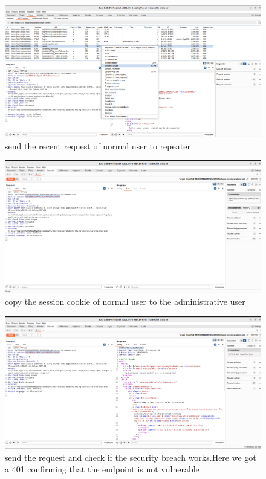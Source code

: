 \documentclass[
	a4paper, %
	12pt, %
]{CSSullivanBusinessReport}
\begin{document}
\begin{fullwidth}
\begin{figure}[H]
    \centering
    \includegraphics[width=1\textwidth]{Images/anikaScreensots/prev3.png}
    \caption{send the recent request of normal user to repeater}
    \label{fig:enter-label}
\end{figure}

\begin{figure}[H]
    \centering
    \includegraphics[width=1\textwidth]{Images/anikaScreensots/prev4.png}
    \caption{copy the session cookie of normal user to the administrative user}
    \label{fig:enter-label}
\end{figure}


\begin{figure}[H]
    \centering
    \includegraphics[width=1\textwidth]{Images/anikaScreensots/prev5.png}
    \caption{send the request and check if the security breach works.Here we got a 401 confirming that the endpoint is not vulnerable}
    \label{fig:enter-label}
\end{figure}

\end{fullwidth}
\end{document}
